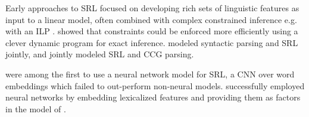 \documentclass[11pt,a4paper]{article}
\begin{document}
Early approaches to SRL \citep{pradhan2005semantic,surdeanu2007combination,johansson2008dependency,toutanova2008global} focused on developing rich sets of linguistic features as input to a linear model, often combined with complex constrained inference e.g. with an ILP \citep{punyakanok2008importance}. \citet{tackstrom2015efficient} showed that constraints could be enforced more efficiently using a clever dynamic program for exact inference. 
\citet{sutton2005joint} modeled syntactic parsing and SRL jointly, and \citet{lewis2015joint} jointly modeled SRL and CCG parsing. 

\citet{collobert2011natural} were among the first to use a neural network model for SRL, a CNN over word embeddings which failed to out-perform non-neural models.
\citet{fitzgerald2015semantic} successfully employed neural networks by embedding lexicalized features and providing them as factors in the model of \citet{tackstrom2015efficient}.
\end{document}
